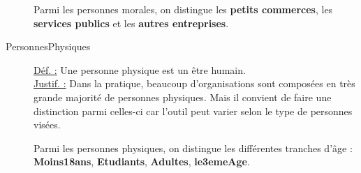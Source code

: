 \begin{description}
Parmi les personnes morales,  on distingue les \textbf{petits commerces},  les \textbf{services publics} et les \textbf{autres entreprises}.

%
%

\item [PersonnesPhysiques]
\underline{Déf. :}  Une personne physique est un être humain.
\\ \underline{Justif. :}  Dans la pratique,  beaucoup d'organisations sont composées en très grande majorité de personnes physiques.  Mais il convient de faire une distinction parmi celles-ci car  l'outil peut varier  selon le type de personnes visées.
\newline

Parmi les personnes physiques,  on distingue les différentes tranches d'âge : \textbf{Moins18ans}, \textbf{Etudiants}, \textbf{Adultes}, \textbf{le3emeAge}.


\end{description}
